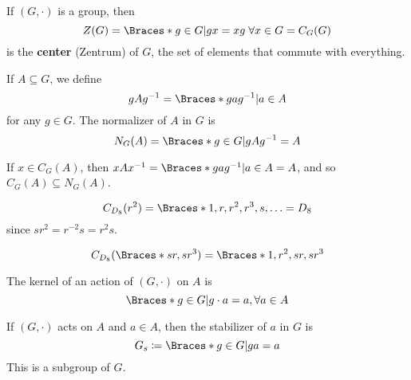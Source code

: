 \documentclass[a5paper]{article}
\begin{document}
\begin{definition}
	If $(G,\cdot)$ is a group, then
  \begin{equation*}
    Z(G)=\braces{g\in G|gx=xg\;\forall x\in G}=C_G(G)
  \end{equation*}
  is the \textbf{center} (Zentrum) of $G$, the set of elements that commute with
  everything. 
\end{definition}

\begin{definition}
	If $A\subseteq G$, we define
  \begin{equation*}
    gAg^{-1}=\braces{gag^{-1}|a\in A}
  \end{equation*}
  for any $g\in G$. The normalizer of $A$ in $G$ is
  \begin{equation*}
    N_G(A)=\braces{g\in G|gAg^{-1}=A}
  \end{equation*}
\end{definition}

\begin{lemma}
  If $x\in C_G(A)$, then $xAx^{-1}=\braces{gag^{-1}|a\in A}=A$, and so
  $C_G(A)\subseteq N_G(A)$.
\end{lemma}

\begin{example}
	\begin{equation*}
    C_{D_8}(r^2)=\braces{1,r,r^2,r^3,s,\ldots}=D_8
  \end{equation*}
  since $sr^{2}=r^{-2}s=r^{2}s$.
  
  \begin{equation*}
    C_{D_8}(\braces{sr,sr^3})=\braces{1,r^2,sr,sr^3}
  \end{equation*}
\end{example}

\begin{definition}
  The kernel of an action of $(G,\cdot)$ on $A$ is
  \begin{equation*}
    \braces{g\in G|g\cdot a=a,\forall a\in A}
  \end{equation*}
\end{definition}


\begin{definition}
	If $(G,\cdot)$ acts on $A$ and $a\in A$, then the stabilizer of $a$ in $G$ is 
  \begin{equation*}
    G_s\coloneqq\braces{g\in G|ga=a}
  \end{equation*}
  This is a subgroup of $G$.
\end{definition}
\end{document}

